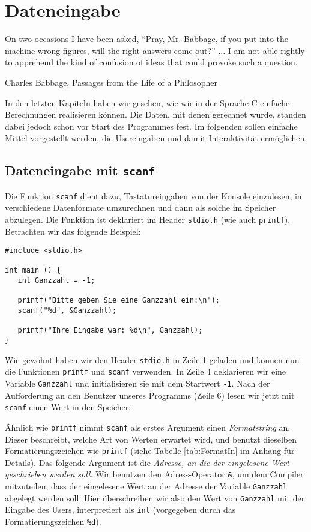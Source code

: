 \chapter{Dateneingabe} \label{chp:Input}
\epigraph{On two occasions I have been asked, \enquote{Pray, Mr. Babbage, if you put into the machine wrong figures, will the right answers come out?} ... I am not able rightly to apprehend the kind of confusion of ideas that could provoke such a question.}{Charles Babbage, Passages from the Life of a Philosopher}

In den letzten Kapiteln haben wir gesehen, wie wir in der Sprache C einfache Berechnungen realisieren können. Die Daten, mit denen gerechnet wurde, standen dabei jedoch schon vor Start des Programmes fest. Im folgenden sollen einfache Mittel vorgestellt werden, die Usereingaben und damit Interaktivität ermöglichen.

\section{Dateneingabe mit \texttt{scanf}}
Die Funktion \texttt{scanf} dient dazu, Tastatureingaben von der Konsole einzulesen, in verschiedene Datenformate umzurechnen und dann als solche im Speicher abzulegen. Die Funktion ist deklariert im Header \texttt{stdio.h} (wie auch \texttt{printf}). Betrachten wir das folgende Beispiel:

\begin{codebox}
\begin{verbatim}
#include <stdio.h>

int main () {
   int Ganzzahl = -1;

   printf("Bitte geben Sie eine Ganzzahl ein:\n");
   scanf("%d", &Ganzzahl);

   printf("Ihre Eingabe war: %d\n", Ganzzahl);
}
\end{verbatim}
\end{codebox}

Wie gewohnt haben wir den Header \texttt{stdio.h} in Zeile 1 geladen und können nun die Funktionen \texttt{printf} und \texttt{scanf} verwenden. In Zeile 4 deklarieren wir eine Variable \texttt{Ganzzahl} und initialisieren sie mit dem Startwert \texttt{-1}. Nach der Aufforderung an den Benutzer unseres Programms (Zeile 6) lesen wir jetzt mit \texttt{scanf} einen Wert in den Speicher:

Ähnlich wie \texttt{printf} nimmt \texttt{scanf} als erstes Argument einen \emph{Formatstring} an. Dieser beschreibt, welche Art von Werten erwartet wird, und benutzt dieselben Formatierungszeichen wie \texttt{printf} (siehe Tabelle \ref{tab:FormatIn} im Anhang für Details). Das folgende Argument ist die \emph{Adresse, an die der eingelesene Wert geschrieben werden soll}. Wir benutzen den Adress-Operator \texttt{\&}, um dem Compiler mitzuteilen, dass der eingelesene Wert an der Adresse der Variable \texttt{Ganzzahl} abgelegt werden soll. Hier überschreiben wir also den Wert von \texttt{Ganzzahl} mit der Eingabe des Users, interpretiert als \texttt{int} (vorgegeben durch das Formatierungszeichen \texttt{\%d}).


